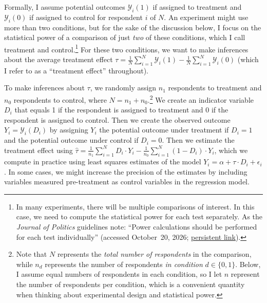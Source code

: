 \documentclass[12pt]{article}
\begin{document}
Formally, I assume potential outcomes $\mathcal{Y}_{i}(1)$ if assigned to treatment and $\mathcal{Y}_{i}(0)$ if assigned to control for respondent $i$ of $N$.
An experiment might use more than two conditions, but for the sake of the discussion below, I focus on the statistical power of a comparison of just \emph{two} of these conditions, which I call treatment and control.\footnote{
   In many experiments, there will be multiple comparisons of interest.
   In this case, we need to compute the statistical power for each test separately.
   As the \textit{Journal of Politics} guidelines note: ``Power calculations should be performed for each test individually'' (accessed October~20, 2026; \href{https://web.archive.org/web/20250702024222/https://www.journals.uchicago.edu/journals/jop/registered-report-guidelines}{persistent link}).
  }
For these two conditions, we want to make inferences about the average treatment effect $\tau = \frac{1}{N}\sum_{i = 1}^{N}{\mathcal{Y}_{i}(1)} - \frac{1}{N}\sum_{i = 1}^{N}{\mathcal{Y}_{i}(0)}$ (which I refer to as a ``treatment effect'' throughout).

To make inferences about $\tau$, we randomly assign $n_{1}$ respondents to treatment and $n_{0}$ respondents to control, where $N = n_{1} + n_{0}$.\footnote{
  Note that $N$ represents the \emph{total number of respondents} in the comparison, while $n_{d}$ represents the number of respondents \emph{in condition} $d \in \{0, 1\}$.
  Below, I assume equal numbers of respondents in each condition, so I let $n$ represent the number of respondents per condition, which is a convenient quantity when thinking about experimental design and statistical power.
  }
We create an indicator variable $D_{i}$ that equals 1 if the respondent is assigned to treatment and 0 if the respondent is assigned to control.
Then we create the observed outcome $Y_{i} = \mathcal{Y}_{i}\left( D_{i} \right)$ by assigning $Y_{i}$ the potential outcome under treatment if $D_{i} = 1$ and the potential outcome under control if $D_{i} = 0$.
Then we estimate the treatment effect using $\widehat{\tau} = \frac{1}{n_{1}}\sum_{i = 1}^{N}{D_{i} \cdot Y_{i}} - \frac{1}{n_{0}}\sum_{i = 1}^{N}{\left( 1 - D_{i} \right) \cdot Y_{i}}$, which we compute in practice using least squares estimates of the model $Y_{i} = \alpha + \tau \cdot D_{i} + \epsilon_{i}$.
In some cases, we might increase the precision of the estimates by including variables measured pre-treatment as control variables in the regression model.
\end{document}
